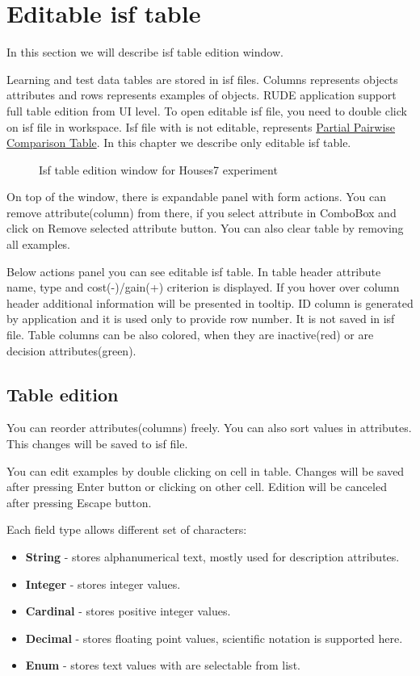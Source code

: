 \section{Editable isf table}\label{section:isf-table}

In this section we will describe isf table edition window.

Learning and test data tables are stored in isf files. Columns represents objects attributes and rows represents examples of objects. RUDE application support full table edition from UI level. To open editable isf file, you need to double click on isf file in workspace. Isf file with is not editable, represents \hyperref[sub:pct-isf]{Partial Pairwise Comparison Table}. In this chapter we describe only editable isf table.

\begin{figure*}[!ht] 
	\centering
	\caption{Isf table edition window for Houses7 experiment}
\end{figure*}

On top of the window, there is expandable panel with form actions.
You can remove attribute(column) from there, if you select attribute in ComboBox and click on Remove selected attribute button. You can also clear table by removing all examples.

Below actions panel you can see editable isf table. In table header attribute name, type and cost(-)/gain(+) criterion is displayed. If you hover over column header additional information will be presented in tooltip. ID column is generated by application and it is used only to provide row number. It is not saved in isf file. Table columns can be also colored, when they are inactive(red) or are decision attributes(green).

\subsection{Table edition}\label{sub:isf-examples}

You can reorder attributes(columns) freely. You can also sort values in attributes. This changes will be saved to isf file.

You can edit examples by double clicking on cell in table. Changes will be saved after pressing Enter button or clicking on other cell. Edition will be canceled after pressing Escape button.

Each field type allows different set of characters:
\begin{itemize}
	\item \textbf{String} - stores alphanumerical text, mostly used for description attributes.
	\item \textbf{Integer} - stores integer values.
	\item \textbf{Cardinal} - stores positive integer values.
	\item \textbf{Decimal} - stores floating point values, scientific notation is supported here.
	\item \textbf{Enum} - stores text values with are selectable from list.
\end{itemize}

